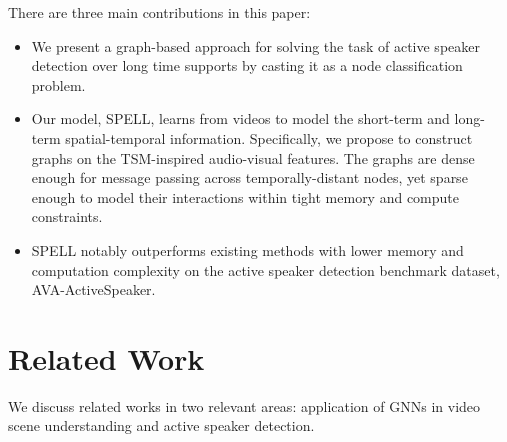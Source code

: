 \documentclass[runningheads]{llncs}
\begin{document}
There are three main contributions in this paper:
\begin{itemize}[noitemsep,nolistsep]
    \item We present a graph-based approach for solving the task of active speaker detection 
    over long time supports  
    by casting it as a node classification problem. \item Our model, SPELL, learns from videos to model the short-term and long-term spatial-temporal information. 
    Specifically, we propose to construct graphs on the TSM-inspired audio-visual features.
    The graphs are dense enough for message passing across temporally-distant nodes, yet sparse enough to model their interactions within tight memory and compute constraints.
    






   \item SPELL notably outperforms existing methods with lower memory and computation complexity on the active speaker detection benchmark dataset, AVA-ActiveSpeaker.


   
\end{itemize}














%
 
\section{Related Work}
\label{sec:related}

We discuss related works in two relevant areas: application of GNNs in video scene understanding and active speaker detection.
\end{document}

